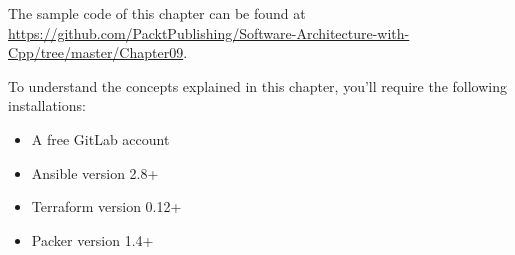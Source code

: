 The sample code of this chapter can be found at \url{https://github.com/PacktPublishing/Software-Architecture-with-Cpp/tree/master/Chapter09}.

To understand the concepts explained in this chapter, you'll require the following installations:

\begin{itemize}
\item 
A free GitLab account

\item 
Ansible version 2.8+

\item 
Terraform version 0.12+

\item 
Packer version 1.4+
\end{itemize}

